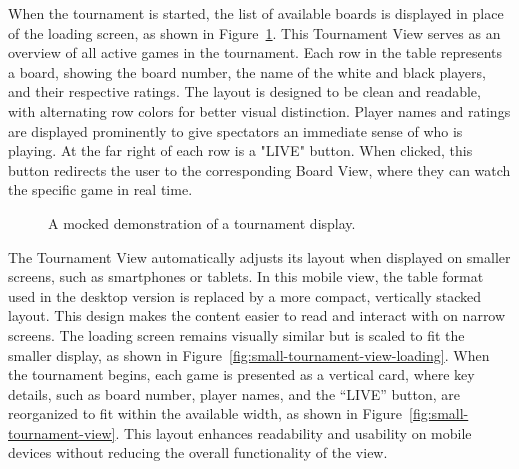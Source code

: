 When the tournament is started, the list of available boards is displayed in place of the loading screen, as shown in Figure~\ref{fig:tournament-view-mocked}. This Tournament View serves as an overview of all active games in the tournament. Each row in the table represents a board, showing the board number, the name of the white and black players, and their respective ratings. The layout is designed to be clean and readable, with alternating row colors for better visual distinction. Player names and ratings are displayed prominently to give spectators an immediate sense of who is playing. At the far right of each row is a "LIVE" button. When clicked, this button redirects the user to the corresponding Board View, where they can watch the specific game in real time. \\

\begin{figure}[h!] \centering {}\caption[Display over tournament]{A mocked demonstration of a tournament display.}\label{fig:tournament-view-mocked} \end{figure}

The Tournament View automatically adjusts its layout when displayed on smaller screens, such as smartphones or tablets. In this mobile view, the table format used in the desktop version is replaced by a more compact, vertically stacked layout. This design makes the content easier to read and interact with on narrow screens. The loading screen remains visually similar but is scaled to fit the smaller display, as shown in Figure~\ref{fig:small-tournament-view-loading}. When the tournament begins, each game is presented as a vertical card, where key details, such as board number, player names, and the “LIVE” button, are reorganized to fit within the available width, as shown in Figure~\ref{fig:small-tournament-view}. This layout enhances readability and usability on mobile devices without reducing the overall functionality of the view. \\

